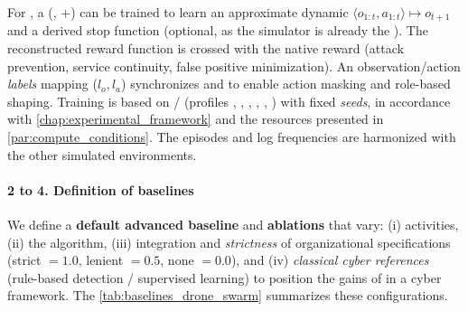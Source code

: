 For , a  (, +) can be trained to learn an approximate dynamic $\langle o_{1:t}, a_{1:t} \rangle \mapsto o_ {t+1}$ and a derived stop function (optional, as the simulator is already the ). The reconstructed reward function is crossed with the native reward (attack prevention, service continuity, false positive minimization). An observation/action \emph{labels} mapping ($l_o, l_a$) synchronizes  and  to enable action masking and role-based shaping. Training is based on / (profiles , , , , , ) with fixed \textit{seeds}, in accordance with \autoref{chap:experimental_framework} and the resources presented in \autoref{par:compute_conditions}. The episodes and log frequencies are harmonized with the other simulated environments.

\paragraph{2 to 4. Definition of baselines}

We define a \textbf{default advanced baseline} and \textbf{ablations} that vary: (i)  activities, (ii) the  algorithm, (iii) integration and \textit {strictness} of organizational specifications (strict $=1.0$, lenient $=0.5$, none $=0.0$), and (iv) \textit{classical cyber references} (rule-based detection / supervised learning) to position the gains of  in a cyber framework. The \autoref {tab:baselines_drone_swarm} summarizes these configurations.


